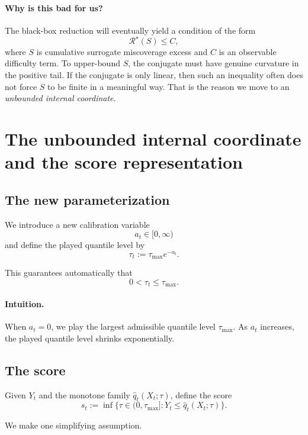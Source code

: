 \documentclass[11pt]{article}
\newcommand{\1}{\mathbf{1}}
\begin{document}
\paragraph{Why is this bad for us?}
The black-box reduction will eventually yield a condition of the form
\[
\mathcal R^\star(S)\le C,
\]
where $S$ is cumulative surrogate miscoverage excess and $C$ is an observable difficulty term. To upper-bound $S$, the conjugate must have genuine curvature in the positive tail. If the conjugate is only linear, then such an inequality often does not force $S$ to be finite in a meaningful way. That is the reason we move to an \emph{unbounded internal coordinate}.

\section{The unbounded internal coordinate and the score representation}

\subsection{The new parameterization}

We introduce a new calibration variable
\[
a_t\in[0,\infty)
\]
and define the played quantile level by
\begin{equation}
\label{eq:tau-param}
\tau_t:=\tau_{\max} e^{-a_t}.
\end{equation}

This guarantees automatically that
\[
0<\tau_t\le \tau_{\max}.
\]

\paragraph{Intuition.}
When $a_t=0$, we play the largest admissible quantile level $\tau_{\max}$. As $a_t$ increases, the played quantile level shrinks exponentially.

\subsection{The score}

Given $Y_t$ and the monotone family $\hat q_t(X_t;\tau)$, define the score
\begin{equation}
\label{eq:score}
s_t:=\inf\{\tau\in(0,\tau_{\max}]: Y_t\le \hat q_t(X_t;\tau)\}.
\end{equation}

We make one simplifying assumption.
\end{document}
